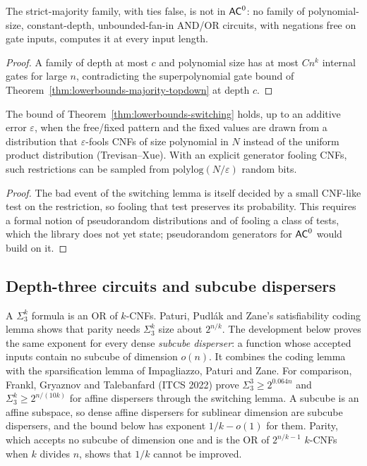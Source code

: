 \begin{theorem}
  \label{thm:lowerbounds-majority-not-ac0}
  \leanok
  The strict-majority family, with ties false, is not in $\mathsf{AC}^0$: no family
  of polynomial-size, constant-depth, unbounded-fan-in AND/OR circuits, with
  negations free on gate inputs, computes it at every input length.
\end{theorem}
\begin{proof}
  \leanok
  A family of depth at most $c$ and polynomial size has at most $Cn^k$
  internal gates for large $n$, contradicting the superpolynomial gate bound of
  Theorem~\ref{thm:lowerbounds-majority-topdown} at depth $c$.
\end{proof}

\begin{theorem}
  \label{thm:lowerbounds-pseudorandom-restrictions}
  \notready
  The bound of Theorem~\ref{thm:lowerbounds-switching} holds, up to an additive
  error $\varepsilon$, when the free/fixed pattern and the fixed values are
  drawn from a distribution that $\varepsilon$-fools CNFs of size
  polynomial in $N$ instead of the uniform product distribution
  (Trevisan--Xue). With an explicit generator fooling CNFs, such restrictions
  can be sampled from $\mathrm{polylog}(N / \varepsilon)$ random bits.
\end{theorem}
\begin{proof}
  The bad event of the switching lemma is itself decided by a small CNF-like
  test on the restriction, so fooling that test preserves its probability.
  This requires a formal notion of pseudorandom distributions and of fooling a
  class of tests, which the library does not yet state; pseudorandom
  generators for $\mathsf{AC}^0$ would build on it.
\end{proof}

\subsection{Depth-three circuits and subcube dispersers}
\label{sec:lowerbounds-depth-three}

A $\Sigma_3^k$ formula is an OR of $k$-CNFs. Paturi, Pudl\'ak and Zane's
satisfiability coding lemma shows that parity needs $\Sigma_3^k$ size about
$2^{n/k}$. The development below proves the same exponent for every dense
\emph{subcube disperser}: a function whose accepted inputs contain no subcube of
dimension $o(n)$. It combines the coding lemma with the sparsification lemma of
Impagliazzo, Paturi and Zane. For comparison, Frankl, Gryaznov and Talebanfard
(ITCS 2022) prove $\Sigma_3^3 \ge 2^{0.064n}$ and $\Sigma_3^k \ge 2^{n/(10k)}$
for affine dispersers through the switching lemma. A subcube is an affine
subspace, so dense affine dispersers for sublinear dimension are subcube
dispersers, and the bound below has exponent $1/k - o(1)$ for them. Parity,
which accepts no subcube of dimension one and is the OR of $2^{n/k-1}$ $k$-CNFs
when $k$ divides $n$, shows that $1/k$ cannot be improved.


